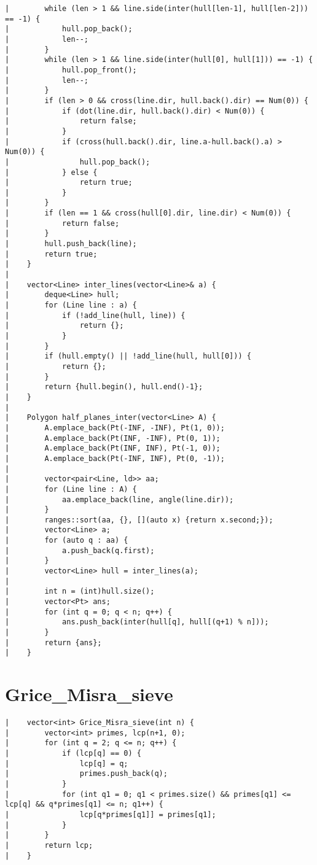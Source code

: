 \documentclass[a4paper, 10pt]{article}
\begin{document}
\begin{center}
\begin{verbatim}
|        while (len > 1 && line.side(inter(hull[len-1], hull[len-2])) == -1) {
|            hull.pop_back();
|            len--;
|        }
|        while (len > 1 && line.side(inter(hull[0], hull[1])) == -1) {
|            hull.pop_front();
|            len--;
|        }
|        if (len > 0 && cross(line.dir, hull.back().dir) == Num(0)) {
|            if (dot(line.dir, hull.back().dir) < Num(0)) {
|                return false;
|            }
|            if (cross(hull.back().dir, line.a-hull.back().a) > Num(0)) {
|                hull.pop_back();
|            } else {
|                return true;
|            }
|        }
|        if (len == 1 && cross(hull[0].dir, line.dir) < Num(0)) {
|            return false;
|        }
|        hull.push_back(line);
|        return true;
|    }
|    
|    vector<Line> inter_lines(vector<Line>& a) {
|        deque<Line> hull;
|        for (Line line : a) {
|            if (!add_line(hull, line)) {
|                return {};
|            }
|        }
|        if (hull.empty() || !add_line(hull, hull[0])) {
|            return {};
|        }
|        return {hull.begin(), hull.end()-1};
|    }
|    
|    Polygon half_planes_inter(vector<Line> A) {
|        A.emplace_back(Pt(-INF, -INF), Pt(1, 0));
|        A.emplace_back(Pt(INF, -INF), Pt(0, 1));
|        A.emplace_back(Pt(INF, INF), Pt(-1, 0));
|        A.emplace_back(Pt(-INF, INF), Pt(0, -1));
|    
|        vector<pair<Line, ld>> aa;
|        for (Line line : A) {
|            aa.emplace_back(line, angle(line.dir));
|        }
|        ranges::sort(aa, {}, [](auto x) {return x.second;});
|        vector<Line> a;
|        for (auto q : aa) {
|            a.push_back(q.first);
|        }
|        vector<Line> hull = inter_lines(a);
|    
|        int n = (int)hull.size();
|        vector<Pt> ans;
|        for (int q = 0; q < n; q++) {
|            ans.push_back(inter(hull[q], hull[(q+1) % n]));
|        }
|        return {ans};
|    }
\end{verbatim}

\section*{Grice\_Misra\_sieve}
\begin{verbatim}
|    vector<int> Grice_Misra_sieve(int n) {
|        vector<int> primes, lcp(n+1, 0);
|        for (int q = 2; q <= n; q++) {
|            if (lcp[q] == 0) {
|                lcp[q] = q;
|                primes.push_back(q);
|            }
|            for (int q1 = 0; q1 < primes.size() && primes[q1] <= lcp[q] && q*primes[q1] <= n; q1++) {
|                lcp[q*primes[q1]] = primes[q1];
|            }
|        }
|        return lcp;
|    }
\end{verbatim}


\end{center}
\end{document}
